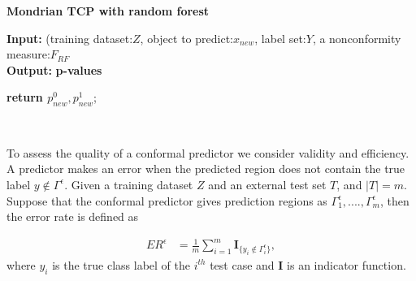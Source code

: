 \documentclass[main]{subfiles}
\begin{document}
\vspace{0.3cm}
\begin{algorithm}[H]
 \caption{\textbf{Mondrian TCP with random forest}} \label{algo:TCP}
 \textbf{Input:}{ (training dataset:$Z$, object to predict:$x_{new}$, label set:$Y$, a nonconformity measure:$F_{RF}$}\\
 \textbf{Output:}{\textbf{ p-values} }\\

 \textbf{return $p_{new}^0,p_{new}^1$};\\
 \end{algorithm}
 \vspace{10pt}
\textbf{ \\}

 
To assess the quality of a conformal predictor we consider validity and efficiency. A predictor makes an error when the predicted region does not contain the true label $ y \not\in \Gamma^{\epsilon}$. Given a training dataset $Z$ and an external test set $T$,  and $|T| = m$. Suppose that the conformal predictor gives prediction regions as $\Gamma_1^{\epsilon}, ...., \Gamma_m^{\epsilon}$, then the error rate is defined as 

\begin{definition}
\begin{align} \label{eq:errorRate}
		ER^{\epsilon} &= \frac{ 1}{m} \sum\limits_{i=1}^{m} \textbf{I}_{ \{y_i \not\in \Gamma_i^{\epsilon} \} },		
\end{align}	
where $y_i$ is the true class label of the $i^{th}$ test case and $\textbf{I}$ is an indicator function. 	
\end{definition}
\end{document}
